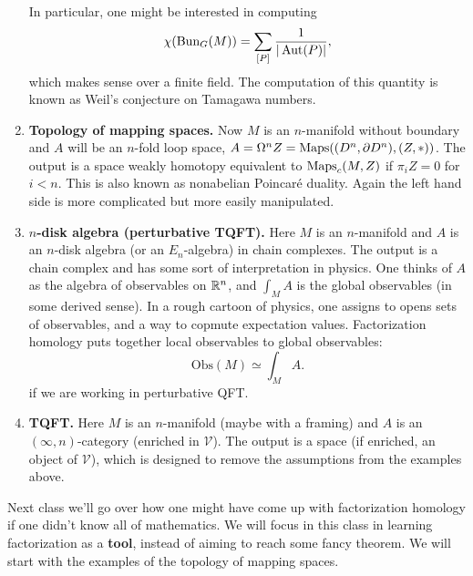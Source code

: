 \documentclass{amsart}
\begin{document}
\begin{enumerate}
        In particular, one might be interested in computing
        \begin{equation*}
            \chi(\text{Bun}_G(M)) = \sum_{[P]}\frac{1}{|\operatorname{Aut}(P)|},
        \end{equation*}
        which makes sense over a finite field. The computation of this quantity is
        known as Weil's conjecture on Tamagawa numbers.

    \item \textbf{Topology of mapping spaces.} Now $M$ is an $n$-manifold without boundary and $A$ will be an
        $n$-fold loop space, $A=\Omega^nZ=\operatorname{Maps}( (D^n,\partial D^n),(Z,*))$. The
        output is a space weakly homotopy equivalent to $\operatorname{Maps}_c(M,Z)$ if $\pi_iZ=0$ for $i<n$.
        This is also known as nonabelian Poincar\'e duality. Again the left hand
        side is more complicated but more easily manipulated.

    \item \textbf{$n$-disk algebra (perturbative TQFT).}
        Here $M$ is an $n$-manifold and $A$ is an $n$-disk algebra (or an $E_n$-algebra)
        in chain complexes. The output is a chain complex and has some sort of interpretation
        in physics. One thinks of $A$ as the algebra of observables on $\mathbb{R}^n$, and
        $\int_M A$ is the global observables (in some derived sense). In a rough
        cartoon of physics, one assigns to opens sets of observables, and a way to copmute
        expectation values. Factorization homology puts together local observables to global
        observables:
        \begin{equation*}
            \text{Obs}(M) \simeq \int_M A.
        \end{equation*}
        if we are working in perturbative QFT.

    \item \textbf{TQFT.} Here $M$ is an $n$-manifold (maybe with a framing) and $A$ is an
        $(\infty,n)$-category (enriched in $\mathcal{V}$).
        The output is a space (if enriched, an object of $\mathcal{V}$), which
        is designed to remove the assumptions from the examples above.
\end{enumerate}

Next class we'll go over how one might have come up with factorization homology
if one didn't know all of mathematics. We will focus in this class in learning
factorization as a \textbf{tool}, instead of aiming to reach some fancy theorem.
We will start with the examples of the topology of mapping spaces.
\end{document}
